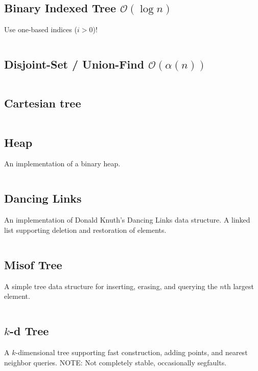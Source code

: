 \documentclass[9pt,a4paper,landscape,oneside]{amsart}
\newcommand{\mintedstyle}[2]{\inputminted{#1}{code/#2}}
\newcommand{\code}[1]{\mintedstyle{cpp}{#1}}
\begin{document}
\begin{multicols*}{3}
\subsection{Binary Indexed Tree $\mathcal{O}(\log n)$}

Use one-based indices ($i > 0$)!
\code{datastructures/bit.cpp}

\subsection{Disjoint-Set / Union-Find $\mathcal{O}(\alpha (n))$}
\code{datastructures/dsu.cpp}


\subsection{Cartesian tree}
\code{datastructures/cartesian_tree.cpp}

\subsection{Heap}
An implementation of a binary heap.
\code{datastructures/heap.cpp}

\subsection{Dancing Links}
An implementation of Donald Knuth's Dancing Links data structure. A
linked list supporting deletion and restoration of elements.
\code{datastructures/dancing_links.cpp}

\subsection{Misof Tree}
A simple tree data structure for inserting, erasing, and querying the
$n$th largest element.
\code{datastructures/misof_tree.cpp}

\subsection{$k$-d Tree}
A $k$-dimensional tree supporting fast construction, adding points, and
nearest neighbor queries.
NOTE: Not completely stable, occasionally segfaults.
\code{datastructures/kd_tree.cpp}


\end{multicols*}
\end{document}

